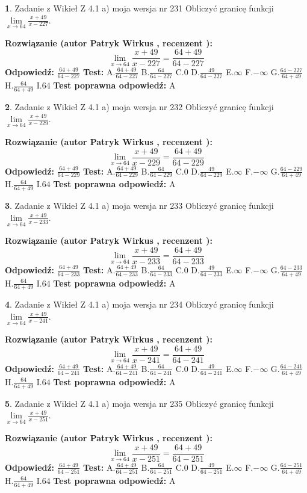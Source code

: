 \documentclass[12pt, a4paper]{article}
\theoremstyle{definition} %
\newtheorem{zad}{}
\newcommand{\zadStart}[1]{\begin{zad}#1\newline}
\newcommand{\zadStop}{\end{zad}}
\newcommand{\rozwStart}[2]{\noindent \textbf{Rozwiązanie (autor #1 , recenzent #2): }\newline}
\newcommand{\rozwStop}{\newline}
\newcommand{\odpStart}{\noindent \textbf{Odpowiedź:}\newline}
\newcommand{\odpStop}{\newline}
\newcommand{\testStart}{\noindent \textbf{Test:}\newline}
\newcommand{\testStop}{\newline}
\newcommand{\kluczStart}{\noindent \textbf{Test poprawna odpowiedź:}\newline}
\newcommand{\kluczStop}{\newline}
\begin{document}
\zadStart{Zadanie z Wikieł Z 4.1 a) moja wersja nr 231}
Obliczyć granicę funkcji $\lim\limits_{x\to64}\frac{x+49}{x-227}$.
\zadStop
\rozwStart{Patryk Wirkus}{}
$$\lim\limits_{x\to64}\frac{x+49}{x-227} = \frac{64+49}{64-227}$$
\rozwStop
\odpStart
$\frac{64+49}{64-227}$
\odpStop
\testStart
A.$\frac{64+49}{64-227}$
B.$\frac{64}{64-227}$
C.$0$
D.$\frac{49}{64-227}$
E.$\infty$
F.$-\infty$
G.$\frac{64-227}{64+49}$
H.$\frac{64}{64+49}$
I.$64$
\testStop
\kluczStart
A
\kluczStop



\zadStart{Zadanie z Wikieł Z 4.1 a) moja wersja nr 232}
Obliczyć granicę funkcji $\lim\limits_{x\to64}\frac{x+49}{x-229}$.
\zadStop
\rozwStart{Patryk Wirkus}{}
$$\lim\limits_{x\to64}\frac{x+49}{x-229} = \frac{64+49}{64-229}$$
\rozwStop
\odpStart
$\frac{64+49}{64-229}$
\odpStop
\testStart
A.$\frac{64+49}{64-229}$
B.$\frac{64}{64-229}$
C.$0$
D.$\frac{49}{64-229}$
E.$\infty$
F.$-\infty$
G.$\frac{64-229}{64+49}$
H.$\frac{64}{64+49}$
I.$64$
\testStop
\kluczStart
A
\kluczStop



\zadStart{Zadanie z Wikieł Z 4.1 a) moja wersja nr 233}
Obliczyć granicę funkcji $\lim\limits_{x\to64}\frac{x+49}{x-233}$.
\zadStop
\rozwStart{Patryk Wirkus}{}
$$\lim\limits_{x\to64}\frac{x+49}{x-233} = \frac{64+49}{64-233}$$
\rozwStop
\odpStart
$\frac{64+49}{64-233}$
\odpStop
\testStart
A.$\frac{64+49}{64-233}$
B.$\frac{64}{64-233}$
C.$0$
D.$\frac{49}{64-233}$
E.$\infty$
F.$-\infty$
G.$\frac{64-233}{64+49}$
H.$\frac{64}{64+49}$
I.$64$
\testStop
\kluczStart
A
\kluczStop



\zadStart{Zadanie z Wikieł Z 4.1 a) moja wersja nr 234}
Obliczyć granicę funkcji $\lim\limits_{x\to64}\frac{x+49}{x-241}$.
\zadStop
\rozwStart{Patryk Wirkus}{}
$$\lim\limits_{x\to64}\frac{x+49}{x-241} = \frac{64+49}{64-241}$$
\rozwStop
\odpStart
$\frac{64+49}{64-241}$
\odpStop
\testStart
A.$\frac{64+49}{64-241}$
B.$\frac{64}{64-241}$
C.$0$
D.$\frac{49}{64-241}$
E.$\infty$
F.$-\infty$
G.$\frac{64-241}{64+49}$
H.$\frac{64}{64+49}$
I.$64$
\testStop
\kluczStart
A
\kluczStop



\zadStart{Zadanie z Wikieł Z 4.1 a) moja wersja nr 235}
Obliczyć granicę funkcji $\lim\limits_{x\to64}\frac{x+49}{x-251}$.
\zadStop
\rozwStart{Patryk Wirkus}{}
$$\lim\limits_{x\to64}\frac{x+49}{x-251} = \frac{64+49}{64-251}$$
\rozwStop
\odpStart
$\frac{64+49}{64-251}$
\odpStop
\testStart
A.$\frac{64+49}{64-251}$
B.$\frac{64}{64-251}$
C.$0$
D.$\frac{49}{64-251}$
E.$\infty$
F.$-\infty$
G.$\frac{64-251}{64+49}$
H.$\frac{64}{64+49}$
I.$64$
\testStop
\kluczStart
A
\kluczStop
\end{document}
